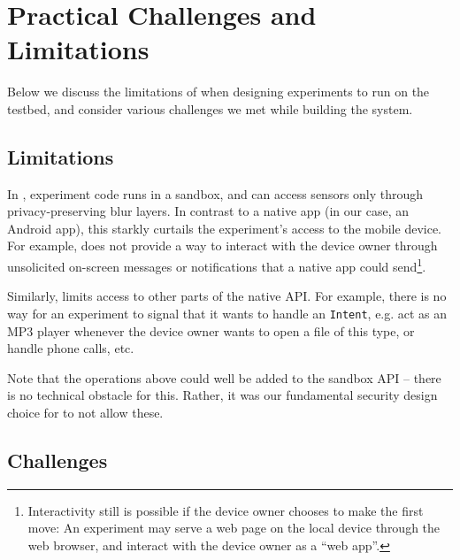 \section{Practical Challenges and Limitations}\label{sec-limitation}

Below we discuss the limitations of \sysname 
when designing experiments to run on the testbed, 
and consider various challenges we met while building the system.

\subsection{Limitations}\label{subsec-limitations}
In \sysname, experiment code runs in a sandbox, and 
can access sensors only through privacy-preserving blur layers. 
In contrast to a native app (in our case, an Android app), this starkly curtails 
the experiment's access to the mobile device. For example, \sysname 
does not provide a way to interact with the device owner 
through unsolicited on-screen messages or notifications that a native 
app could send\footnote{\scriptsize Interactivity still is possible if the device 
owner chooses to make the first move: An experiment may serve a web 
page on the local device through the web browser, and interact with 
the device owner as a ``web app''.}. 

Similarly, \sysname limits access to other parts 
of the native API. For example, there is no way for an experiment to 
signal that it wants to handle an \texttt{Intent}, e.g. 
act as an MP3 player whenever the device owner wants to open a file 
of this type, or handle phone calls, etc.

Note that the operations above 
could well be added to the sandbox API -- there is no technical 
obstacle for this. Rather, it was our fundamental security design 
choice for \sysname to not allow these.


\subsection{Challenges}\label{subsec-challenges}

